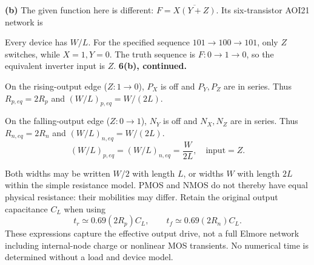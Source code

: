 \documentclass[10pt]{article}
\newcommand{\mos}[4]{\begin{scope}[shift={(#1,#2)}]
\draw (0,.24)--(0,-.24);\draw (0,.20)--(.25,.20)--(.25,.5);
\draw (0,-.20)--(.25,-.20)--(.25,-.5);\draw (-.16,.23)--(-.16,-.23);
\ifnum#4=1\draw (-.26,0) circle (.06);\draw (-.75,0)--(-.32,0);\else\draw (-.75,0)--(-.16,0);\fi
\node[anchor=east,font=\scriptsize] at (-.76,0) {$#3$};\end{scope}}
\newcommand{\ground}[2]{\draw (#1,#2)--(#1,{#2-.12});\draw ({#1-.17},{#2-.12})--({#1+.17},{#2-.12});\draw ({#1-.11},{#2-.20})--({#1+.11},{#2-.20});}
\begin{document}
\textbf{(b)} The given function here is different: $F=\overline{X(Y+Z)}$. Its six-transistor AOI21 network is
\begin{center}\end{center}
Every device has $W/L$. For the specified sequence $101\to100\to101$, only $Z$ switches, while $X=1,Y=0$. The truth sequence is $F:0\to1\to0$, so the equivalent inverter input is $Z$.
\newpage
\textbf{6(b), continued.}

On the rising-output edge ($Z:1\to0$), $P_X$ is off and $P_Y,P_Z$ are in series. Thus $R_{p,eq}=2R_p$ and $(W/L)_{p,eq}=W/(2L)$.

On the falling-output edge ($Z:0\to1$), $N_Y$ is off and $N_X,N_Z$ are in series. Thus $R_{n,eq}=2R_n$ and $(W/L)_{n,eq}=W/(2L)$.
\[\boxed{(W/L)_{p,eq}=(W/L)_{n,eq}=\frac{W}{2L},\quad\text{input}=Z.}\]
\begin{center}\end{center}
Both widths may be written $W/2$ with length $L$, or widths $W$ with length $2L$ within the simple resistance model. PMOS and NMOS do not thereby have equal physical resistance: their mobilities may differ. Retain the original output capacitance $C_L$ when using
\[t_r\simeq0.69(2R_p)C_L,\qquad t_f\simeq0.69(2R_n)C_L.\]
These expressions capture the effective output drive, not a full Elmore network including internal-node charge or nonlinear MOS transients. No numerical time is determined without a load and device model.
\end{document}
